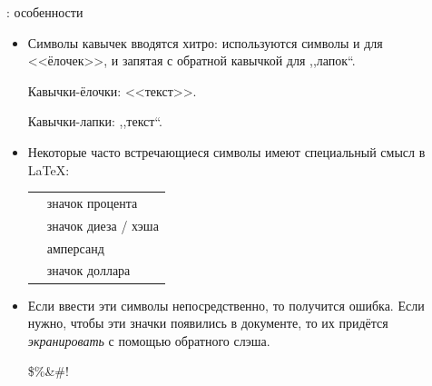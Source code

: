 \documentclass{beamer}
\begin{document}
\begin{frame}[fragile]{\insertsubsection{}: особенности}
\vspace{-3ex}
\small
\begin{itemize}
\item Символы кавычек вводятся хитро: используются символы \keystroke{<} и
  \keystroke{>} для <<ёлочек>>, и запятая \keystroke{,} с обратной кавычкой
   для ,,лапок``.
\begin{exampletwouptiny}
Кавычки-ёлочки: <<текст>>.

Кавычки-лапки: ,,текст``.
\end{exampletwouptiny}
\item Некоторые часто встречающиеся символы имеют специальный смысл в \LaTeX:

\begin{tabular}{cl}
\keystrokebftt{\%} & значок процента     \\
\keystrokebftt{\#} & значок диеза / хэша \\
\keystrokebftt{\&} & амперсанд           \\
\keystrokebftt{\$} & значок доллара      \\
\end{tabular}
\item Если ввести эти символы непосредственно, то получится ошибка. Если
  нужно, чтобы эти значки появились в документе, то их придётся \emph{экранировать}
  с помощью обратного слэша.
\begin{exampletwoup}
\$\%\&\#!
\end{exampletwoup}
\end{itemize}
\end{frame}
\end{document}
